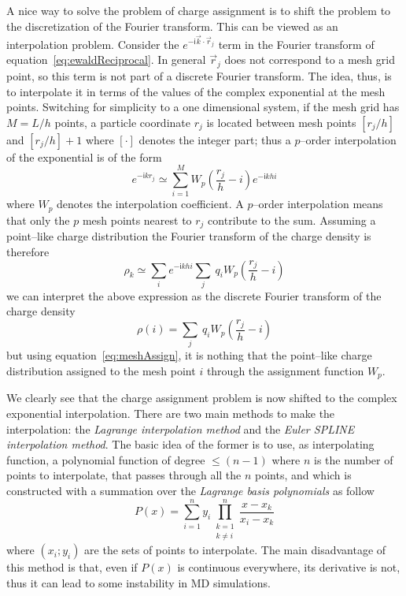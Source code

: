A nice way to solve the problem of charge assignment is to shift the problem to the discretization of the Fourier
transform. This can be viewed as an interpolation problem. Consider the $e^{-\mathsf{i}\vec k\cdot \vec r_j}$
term in the Fourier transform of equation~\eqref{eq:ewaldReciprocal}. In general $\vec r_j$ does not correspond
to a mesh grid point, so this term is not part of a discrete Fourier transform. The idea, thus, is to interpolate
it in terms of the values of the complex exponential at the mesh points. Switching for simplicity to a one
dimensional system, if the mesh grid has $M = L/h$ points, a particle coordinate $r_j$ is located between mesh
points $[r_j/h]$ and $[r_j/h] + 1$ where $[\cdot]$ denotes the integer part; thus a $p$--order interpolation of
the exponential is of the form
\begin{equation*}
	e^{-\mathsf{i}kr_j} \simeq \sum_{i=1}^M W_{p}\left ( \frac{r_j}{h} - i \right ) e^{-\mathsf{i}khi}
\end{equation*}
where $W_{p}$ denotes the interpolation coefficient. A $p$--order interpolation means that only the $p$ mesh
points nearest to $r_j$ contribute to the sum. Assuming a point--like charge distribution the Fourier transform
of the charge density is therefore
\begin{equation*}
	\rho_k \simeq \sum_{i}e^{-\mathsf{i}khi} \sum_j\ q_iW_{p} \left ( \frac{r_j}{h} - i \right )
\end{equation*}
we can interpret the above expression as the discrete Fourier transform of the charge density
\begin{equation*}
	\rho(i) = \sum_j\ q_iW_{p} \left ( \frac{r_j}{h} - i \right )
\end{equation*}
but using equation~\eqref{eq:meshAssign}, it is nothing that the point--like charge distribution assigned to the
mesh point $i$ through the assignment function $W_{p}$.

We clearly see that the charge assignment problem is now shifted to the complex exponential interpolation. There
are two main methods to make the interpolation: the \textit{Lagrange interpolation method} and the \textit{Euler
SPLINE interpolation method}. The basic idea of the former is to use, as interpolating function, a polynomial
function of degree $ \le (n-1)$ where $n$ is the number of points to interpolate, that passes through all the $n$
points, and which is constructed with a summation over the \textit{Lagrange basis polynomials} as follow
\begin{equation*}
	P(x) = \sum_{i=1}^n y_i \prod_{\substack{k=1\\k\ne i}}^n \frac{x-x_k}{x_i - x_k}
\end{equation*}
where $(x_i;y_i)$ are the sets of points to interpolate. The main disadvantage of this method is that, even if
$P(x)$ is continuous everywhere, its derivative is not, thus it can lead to some instability in \ac{MD}
simulations.


